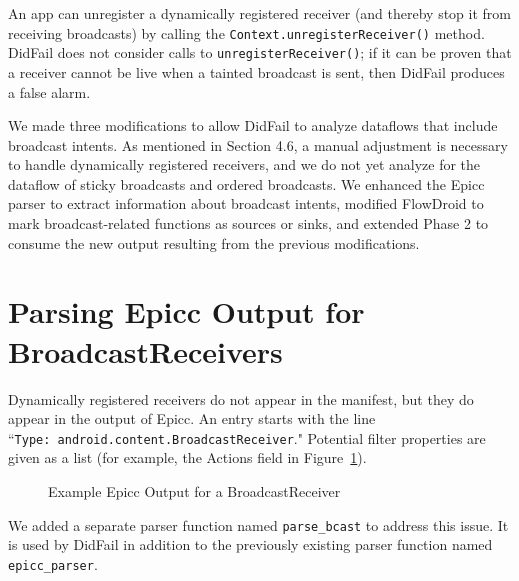An app can unregister a dynamically registered receiver (and thereby stop it from receiving broadcasts) by calling the \texttt{Context.unregisterReceiver()} method.  DidFail does not consider calls to \texttt{unregisterReceiver()}; if it can be proven that a receiver cannot be live when a tainted broadcast is sent, then DidFail produces a false alarm.

We made three modifications to allow DidFail to analyze dataflows that include broadcast intents. As mentioned in Section 4.6, a manual adjustment is necessary to handle dynamically registered receivers, and we do not yet analyze for the dataflow of sticky broadcasts and ordered broadcasts. We enhanced the Epicc parser to extract information about broadcast intents, modified FlowDroid to mark broadcast-related functions as sources or sinks, and extended Phase 2 to consume the new output resulting from the previous modifications.

\section{Parsing Epicc Output for BroadcastReceivers}
Dynamically registered receivers do not appear in the manifest, but they do appear in the output of Epicc.  An entry starts with the line ``\texttt{Type:\ android.content.BroadcastReceiver}."  Potential filter properties are given as a list (for example, the Actions field in Figure~\ref{fig:bcast_epicc_output}).

\begin{figure}[!h]
\begin{framed}

\caption{Example Epicc Output for a BroadcastReceiver}
\label{fig:bcast_epicc_output}
\end{framed}
\end{figure}

We added a separate parser function named \texttt{parse\_bcast} to address this issue. It is used by DidFail in addition to the previously existing parser function named \texttt{epicc\_parser}.


